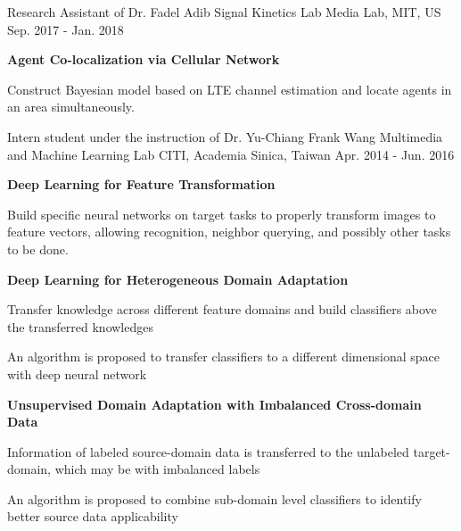 \documentclass[12pt, a4paper]{awesome-cv}
\begin{document}
\begin{cventries}
    \cventry
    {Research Assistant of Dr. Fadel Adib}
    {Signal Kinetics Lab}
    {Media Lab, MIT, US}
    {Sep. 2017 - Jan. 2018}
    {
        \begin{cvitems}
        \item{\bfseries Agent Co-localization via Cellular Network}
            \begin{cvitems}
                \item{Construct Bayesian model based on LTE channel estimation and locate agents in an area simultaneously.}
            \end{cvitems}
        \end{cvitems} 
    }

    \cventry
    {Intern student under the instruction of Dr. Yu-Chiang Frank Wang}
    {Multimedia and Machine Learning Lab}
    {CITI, Academia Sinica, Taiwan}
    {Apr. 2014 - Jun. 2016}
    {
        \begin{cvitems}
        \item{\bfseries Deep Learning for Feature Transformation}
            \begin{cvitems}
            \item{Build specific neural networks on target tasks to properly transform images to feature vectors, allowing recognition, neighbor querying, and possibly other tasks to be done.}
            \end{cvitems}
        \item{\bfseries Deep Learning for Heterogeneous Domain Adaptation}
            \begin{cvitems}
            \item{Transfer knowledge across different feature domains and build classifiers above the transferred knowledges}
            \item{An algorithm is proposed to transfer classifiers to a different dimensional space with deep neural network}
            \end{cvitems}
        \item{\bfseries Unsupervised Domain Adaptation with Imbalanced Cross-domain Data}
            \begin{cvitems}
            \item{Information of labeled source-domain data is transferred to the unlabeled target-domain, which may be with imbalanced labels}
            \item{An algorithm is proposed to combine sub-domain level classifiers to identify better source data applicability}

\end{cvitems}
\end{cvitems}}
\end{cventries}
\end{document}

